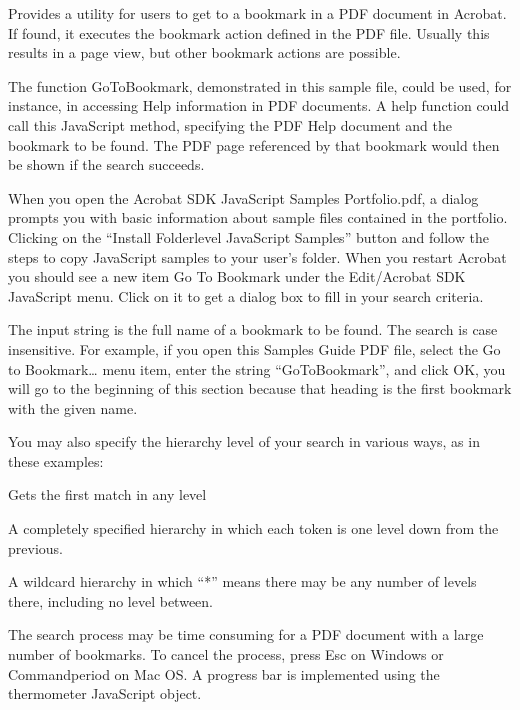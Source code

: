 \documentclass[letterpaper,12pt,english,openany,oneside]{sphinxmanual}
\begin{document}
\label{\detokenize{Samples_JavaScript:description-9}}

Provides a utility for users to get to a bookmark in a PDF document in Acrobat. If found, it executes the bookmark action defined in the PDF file. Usually this results in a page view, but other bookmark actions are possible.

The function GoToBookmark, demonstrated in this sample file, could be used, for instance, in accessing Help information in PDF documents. A help function could call this JavaScript method, specifying the PDF Help document and the bookmark to be found. The PDF page referenced by that bookmark would then be shown if the search succeeds.

When you open the Acrobat SDK JavaScript Samples Portfolio.pdf, a dialog prompts you with basic information about sample files contained in the portfolio. Clicking on the “Install Folder\sphinxhyphen{}level JavaScript Samples” button and follow the steps to copy JavaScript samples to your user’s  folder. When you restart Acrobat you should see a new item Go To Bookmark under the Edit/Acrobat SDK JavaScript menu. Click on it to get a dialog box to fill in your search criteria.

The input string is the full name of a bookmark to be found. The search is case insensitive. For example, if you open this Samples Guide PDF file, select the Go to Bookmark… menu item, enter the string “GoToBookmark”, and click OK, you will go to the beginning of this section because that heading is the first bookmark with the given name.

You may also specify the hierarchy level of your search in various ways, as in these examples:

 \sphinxhyphen{} Gets the first match in any level

 \sphinxhyphen{} A completely specified hierarchy in which each token is one level down from the previous.

 \sphinxhyphen{} A wildcard hierarchy in which “*” means there may be any number of levels there, including no level between.

The search process may be time consuming for a PDF document with a large number of bookmarks. To cancel the process, press Esc on Windows or Command\sphinxhyphen{}period on Mac OS. A progress bar is implemented using the thermometer JavaScript object.
\end{document}
